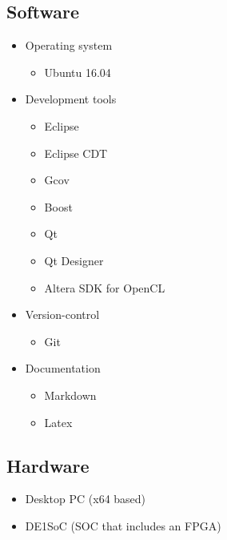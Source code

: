 \documentclass[parskip=full]{scrartcl}
\begin{document}
\subsection {Software}

\begin{itemize}
	\item Operating system
	\begin{itemize}
		\item Ubuntu 16.04
	\end{itemize}
	\item Development tools
	\begin{itemize}
		\item Eclipse
		\item Eclipse CDT
		\item Gcov
		\item Boost
		\item Qt
		\item Qt Designer
		\item Altera SDK for OpenCL
	\end{itemize}
	\item Version-control
	\begin{itemize}
		\item Git
	\end{itemize}
	\item Documentation
	\begin{itemize}
		\item Markdown
		\item Latex
	\end{itemize}
\end{itemize}

\subsection {Hardware}

\begin{itemize}
	\item Desktop PC (x64 based)
	\item DE1SoC (SOC that includes an FPGA)
\end{itemize}

\pagebreak
\end{document}
